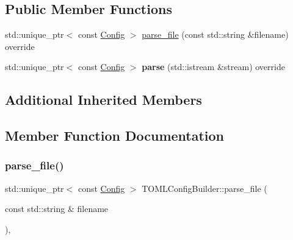 \subsection*{Public Member Functions}
\begin{DoxyCompactItemize}
\item 
std\+::unique\+\_\+ptr$<$ const \hyperlink{classtheoria_1_1config_1_1Config}{Config} $>$ \hyperlink{classtheoria_1_1config_1_1TOMLConfigBuilder_afba5445b56e12b39cf1b266627a27f58}{parse\+\_\+file} (const std\+::string \&filename) override
\item 
\mbox{\label{classtheoria_1_1config_1_1TOMLConfigBuilder_ac5a36aebe769d67decc9946ee2a3fbc3}} 
std\+::unique\+\_\+ptr$<$ const \hyperlink{classtheoria_1_1config_1_1Config}{Config} $>$ {\bfseries parse} (std\+::istream \&stream) override
\end{DoxyCompactItemize}
\subsection*{Additional Inherited Members}


\subsection{Member Function Documentation}
\mbox{\label{classtheoria_1_1config_1_1TOMLConfigBuilder_afba5445b56e12b39cf1b266627a27f58}} 
\subsubsection{\texorpdfstring{parse\+\_\+file()}{parse\_file()}}
{\footnotesize\ttfamily std\+::unique\+\_\+ptr$<$ const \hyperlink{classtheoria_1_1config_1_1Config}{Config} $>$ T\+O\+M\+L\+Config\+Builder\+::parse\+\_\+file (\begin{DoxyParamCaption}\item[{const std\+::string \&}]{filename }\end{DoxyParamCaption})\hspace{0.3cm}{\ttfamily [override]}, {\ttfamily [virtual]}}

